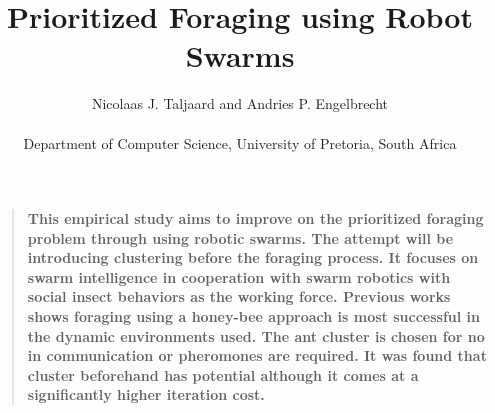 \documentclass[12pt]{article}
\title{Prioritized Foraging using Robot Swarms}
\author
{Nicolaas J. Taljaard and Andries P. Engelbrecht\\
\\
\normalsize{Department of Computer Science, University of Pretoria, South Africa}\\
}
\date{}
\newenvironment{sciabstract}{%
\begin{quote} \bf}
{\end{quote}}
\begin{document}
 


\baselineskip24pt


\maketitle 




\begin{sciabstract}
  This empirical study aims to improve on the prioritized foraging problem through using robotic swarms. The attempt will be introducing clustering before the foraging process. It focuses on swarm intelligence in cooperation with swarm robotics with social insect behaviors as the working force. Previous works shows foraging using a honey-bee approach is most successful in the dynamic environments used. The ant cluster is chosen for no in communication or pheromones are required. It was found that cluster beforehand has potential although it comes at a significantly higher iteration cost.
\end{sciabstract}


\end{document}

